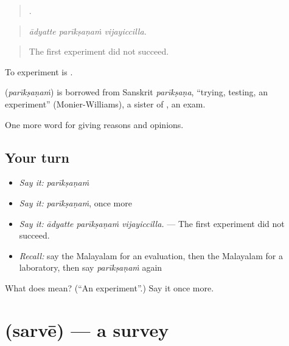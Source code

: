 \begin{quote}
  .
\end{quote}

\begin{quote}
\emph{ādyatte parīkṣaṇaṁ vijayiccilla.}
\end{quote}

\begin{quote}
The first experiment did not succeed.
\end{quote}

To experiment is  .

\begin{cousinweb}
\textbf{} (\emph{parīkṣaṇaṁ}) is borrowed from Sanskrit \emph{parīkṣaṇa}, \textquotedblleft{}trying, testing, an experiment\textquotedblright{} (Monier-Williams), a sister of , an exam.
\end{cousinweb}

\begin{grammarlens}[title={What you've built}]
One more word for giving reasons and opinions.
\end{grammarlens}

\subsection*{Your turn}
\begin{itemize}
\raggedright
  \item \emph{Say it:} \emph{parīkṣaṇaṁ}
  \item \emph{Say it:} \emph{parīkṣaṇaṁ}, once more
  \item \emph{Say it:} \emph{ādyatte parīkṣaṇaṁ vijayiccilla.} — The first experiment did not succeed.
  \item \emph{Recall:} say the Malayalam for an evaluation, then the Malayalam for a laboratory, then say \emph{parīkṣaṇaṁ} again
\end{itemize}

\begin{tcolorbox}[breakable,colback=teal!4,colframe=teal!35!black,title={Before you move on}]
What does  mean? (\textquotedblleft{}An experiment\textquotedblright{}.) Say it once more.
\end{tcolorbox}
\section[\texorpdfstring{\ml{സർവേ} (sarvē)}{സർവേ (sarvē)}]{ (sarvē) — a survey}

